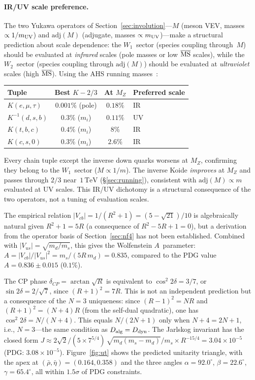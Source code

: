 \documentclass[12pt,a4paper]{article}
\makeatletter
\newcommand{\adj}{\mathrm{adj}}
\newcommand{\TeV}{\,\mathrm{TeV}}
\newcommand{\ie}{i.e.\@}
\makeatother
\begin{document}
\paragraph{IR/UV scale preference.}
The two Yukawa operators of Section~\ref{sec:involution}---$M$
(meson VEV, masses $\propto 1/m_{\rm UV}$) and $\adj(M)$
(adjugate, masses $\propto m_{\rm UV}$)---make a structural
prediction about scale dependence: the $W_1$~sector (species
coupling through~$M$) should be evaluated at \emph{infrared}
scales (pole masses or low $\overline{\rm MS}$ scales), while
the $W_2$~sector (species coupling through $\adj(M)$) should be
evaluated at \emph{ultraviolet} scales (high $\overline{\rm MS}$).
Using the AHS running masses~\cite{AntuschHinzeSaad:2025}:
\begin{center}
\begin{tabular}{lccl}
\toprule
Tuple & Best $K - 2/3$ & At $M_Z$ & Preferred scale \\
\midrule
$K(e,\mu,\tau)$ & $0.001\%$ (pole) & $0.18\%$ & IR \\
$K^{-1}(d,s,b)$ & $0.3\%$ ($m_i$) & $0.11\%$ & UV \\
$K(t,b,c)$ & $0.4\%$ ($m_i$) & $8\%$ & IR \\
$K(c,s,0)$ & $0.3\%$ ($m_i$) & $2.6\%$ & IR \\
\bottomrule
\end{tabular}
\end{center}
Every chain tuple except the inverse down quarks worsens at $M_Z$,
confirming they belong to the $W_1$~sector ($M \propto 1/m$).
The inverse Koide \emph{improves} at $M_Z$ and passes through
$2/3$ near~$1\TeV$ (\S\ref{sec:running}), consistent with
$\adj(M) \propto m$ evaluated at UV scales. This IR/UV
dichotomy is a structural consequence of the two operators,
not a tuning of evaluation scales.

The empirical relation $|V_{cb}| = 1/(R^2 + 1) = (5-\sqrt{21})/10$
is algebraically natural given $R^2 + 1 = 5R$ (a consequence of
$R^2 - 5R + 1 = 0$), but a derivation from the operator basis of
Section~\ref{sec:nf4} has not been established.
Combined with $|V_{us}| = \sqrt{m_d/m_s}$, this gives the Wolfenstein
$A$~parameter: $A = |V_{cb}|/|V_{us}|^2 = m_s/(5R\,m_d) = 0.835$,
compared to the PDG value $A = 0.836 \pm 0.015$ ($0.1\%$).

The CP phase $\delta_{CP} = \arctan\sqrt{R}$ is equivalent to
$\cos^2 2\delta = 3/7$, or $\sin 2\delta = 2/\sqrt{7}$, since
$(R{+}1)^2 = 7R$. This is not an independent prediction but a
consequence of the $N=3$ uniqueness:
since $(R{-}1)^2 = NR$ and $(R{+}1)^2 = (N{+}4)R$ (from the self-dual
quadratic), one has $\cos^2 2\delta = N/(N{+}4)$. This equals
$N/(2N{+}1)$ only when $N{+}4 = 2N{+}1$, \ie, $N=3$---the same
condition as $D_{\rm alg} = D_{\rm dyn}$.
The Jarlskog invariant has the closed form
$J \approx 2\sqrt{2}/(5 \times 7^{5/4})\,\sqrt{m_d(m_s{-}m_d)}/m_s
\times R^{-15/4} = 3.04 \times 10^{-5}$ (PDG: $3.08 \times 10^{-5}$).
Figure~\ref{fig:ut} shows the predicted unitarity triangle, with the
apex at $(\bar\rho, \bar\eta) = (0.164, 0.358)$ and the three angles
$\alpha = 92.0^\circ$, $\beta = 22.6^\circ$, $\gamma = 65.4^\circ$,
all within $1.5\sigma$ of PDG constraints.
\end{document}
